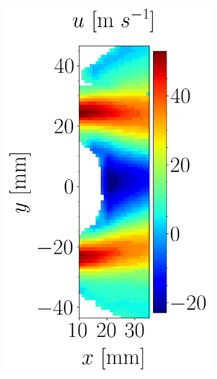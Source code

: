 \begin{figure}[h!]
\begin{subfigure}[b]{0.3\textwidth}
\end{subfigure}
\hspace*{0.1in}
\begin{subfigure}[b]{0.3\textwidth}
	\centering
   \includegraphics[scale=0.4]{./part3_applications/figures_ch9_lagrangian/expe_maps/u_axial_map.png}
\end{subfigure}
\hspace*{0.1in}

\end{figure}
